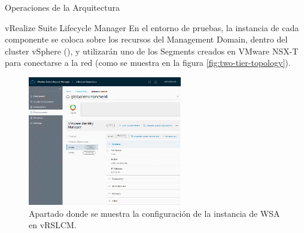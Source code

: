 \begin{subsection}{Operaciones de la Arquitectura}
\begin{subsubsection}{vRealize Suite Lifecycle Manager}
        En el entorno de pruebas, la instancia de cada componente se coloca sobre los recursos del Management Domain, dentro del cluster vSphere  (), y utilizarán uno de los Segments creados en VMware NSX-T para conectarse a la red (como se muestra en la figura \ref{fig:two-tier-topology}).
        \begin{figure}[h]
            \centering
            \includegraphics[width=0.6\textwidth]{imaxes/pruebaconcepto/vrealize/config-istance-vridm.png}
            \caption{Apartado donde se muestra la configuración de la instancia de WSA en vRSLCM.}
            \label{fig:config-WSA}
        \end{figure}
        



\end{subsubsection}
\end{subsection}
